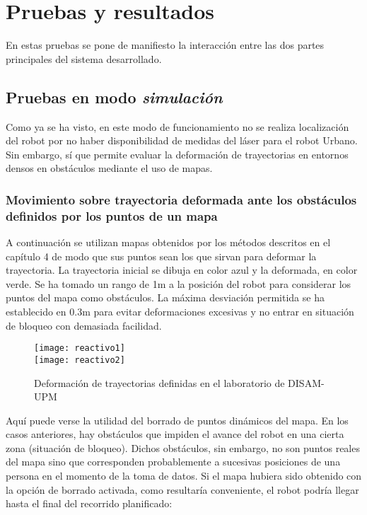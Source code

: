 \section{Pruebas y resultados}
En estas pruebas se pone de manifiesto la interacción entre las dos partes principales del sistema desarrollado.

\subsection{Pruebas en modo \emph{simulación}}
Como ya se ha visto, en este modo de funcionamiento no se realiza localización del robot por no haber disponibilidad de medidas del láser para el robot Urbano. Sin embargo, sí que permite evaluar la deformación de trayectorias en entornos densos en obstáculos mediante el uso de mapas.

\subsubsection{Movimiento sobre trayectoria deformada ante los obstáculos definidos por los puntos de un mapa}
A continuación se utilizan mapas obtenidos por los métodos descritos en el capítulo 4 de modo que sus puntos sean los que sirvan para deformar la trayectoria. La trayectoria inicial se dibuja en color azul y la deformada, en color verde. Se ha tomado un rango de 1m a la posición del robot para considerar los puntos del mapa como obstáculos. La máxima desviación permitida se ha establecido en 0.3m para evitar deformaciones excesivas y no entrar en situación de bloqueo con demasiada facilidad.%

\begin{figure}[h]
  \centering\texttt{[image: reactivo1]}\\
  \hspace{0.5cm}\texttt{[image: reactivo2]}
  \caption{Deformación de trayectorias definidas en el laboratorio de DISAM-UPM}\label{fg:react3}
\end{figure}

Aquí puede verse la utilidad del borrado de puntos dinámicos del mapa. En los casos anteriores, hay obstáculos que impiden el avance del robot en una cierta zona (situación de bloqueo). Dichos obstáculos, sin embargo, no son puntos reales del mapa sino que corresponden probablemente a sucesivas posiciones de una persona en el momento de la toma de datos. Si el mapa hubiera sido obtenido con la opción de borrado activada, como resultaría conveniente, el robot podría llegar hasta el final del recorrido planificado:

